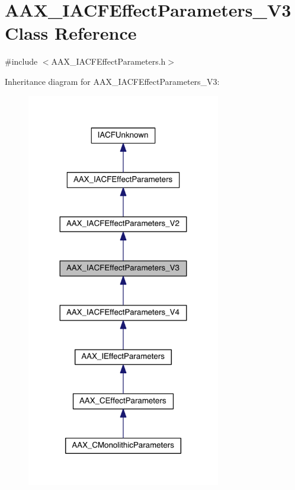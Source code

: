 \hypertarget{a00063}{}\section{A\+A\+X\+\_\+\+I\+A\+C\+F\+Effect\+Parameters\+\_\+\+V3 Class Reference}
\label{a00063}


{\ttfamily \#include $<$A\+A\+X\+\_\+\+I\+A\+C\+F\+Effect\+Parameters.\+h$>$}



Inheritance diagram for A\+A\+X\+\_\+\+I\+A\+C\+F\+Effect\+Parameters\+\_\+\+V3\+:
\nopagebreak
\begin{figure}[H]
\begin{center}
\leavevmode
\includegraphics[width=240pt]{a00532}
\end{center}
\end{figure}


